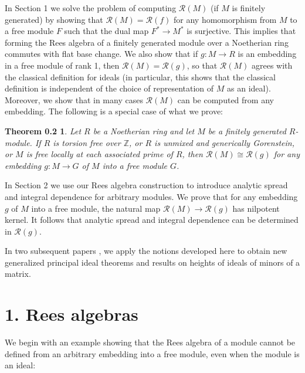 \documentclass{proc-l}
\theoremstyle{plain}
\newtheorem*{theorem1}{Theorem 0.2}
\theoremstyle{definition}
\newcommand{\R}{\mathcal R}
\newcommand{\ZZ}{\mathbb Z}
\begin{document}
In Section 1 we solve the problem of computing $\R (M)$ (if $M$ is
finitely generated) by showing that $\R (M)=\R (f)$ for any
homomorphism from $M$ to a free module $F$ such that the dual map
$F^{*}\to M^{*}$ is surjective. This implies that forming the Rees
algebra of a finitely generated module over a Noetherian 
ring commutes with flat base
change.  We also show that if $g \colon M\to R$ is an embedding in
a free module of rank 1, then $\R (M)=\R (g)$, so that $\R (M)$
agrees with the classical definition for ideals (in particular,
this shows that the classical definition is independent of the
choice of representation of $M$ as an ideal). Moreover, we show
that in many cases $\R (M)$ can be computed from any embedding.
The following is a special case of what we prove:

\begin{theorem1} Let $R$ be a Noetherian ring and let $M$ be
a finitely generated $R$-module. If $R$ is torsion free over
$\ZZ $, or $R$ is unmixed and generically Gorenstein, or $M$ is
free locally at each associated prime of $R$, then
$\R (M)\cong \R (g)$ for any embedding $g \colon M\to G$ of $M$ into
a free module $G$.
\end{theorem1}


In Section 2 we use our Rees algebra construction to introduce
analytic spread and integral dependence for arbitrary modules. We
prove that for any embedding $g$ of $M$ into a free module, the
natural map $\R (M)\to \R (g)$  has nilpotent kernel. It follows
that analytic spread and integral dependence can be determined in
$\R (g)$.

In two subsequent papers \cite{EHU1}, \cite{EHU2} we apply the notions
developed here to obtain new generalized principal ideal theorems
and results on heights of ideals of minors of a matrix.

\section*{1. Rees algebras}

We begin with an example showing that the Rees algebra of a module
cannot be defined from an arbitrary embedding into a free module,
even when the module is an ideal:
\end{document}

